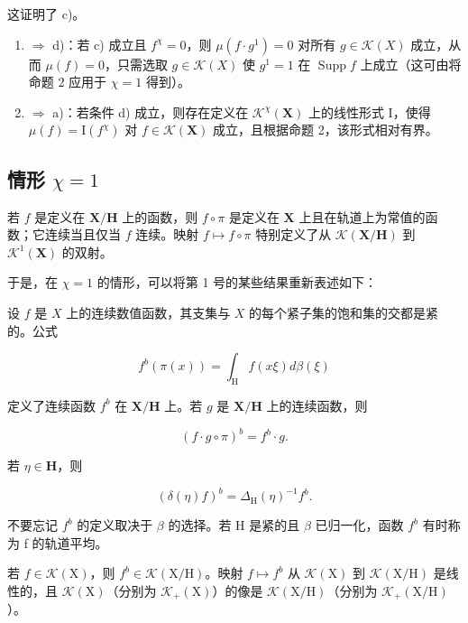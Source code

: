 这证明了 c)。

\begin{enumerate}
\def\labelenumi{\alph{enumi})}
\setcounter{enumi}{2}
\item
  \(\Rightarrow\) d)：若 c) 成立且 \(f^{\chi} = 0\)，则 \(\mu(f \cdot g^{1}) = 0\) 对所有 \(g \in \mathcal{K}(X)\) 成立，从而 \(\mu(f) = 0\)，只需选取 \(g \in \mathcal{K}(X)\) 使 \(g^{1} = 1\) 在 \(\operatorname{Supp} f\) 上成立（这可由将命题 2 应用于 \(\chi = 1\) 得到）。
\item
  \(\Rightarrow\) a)：若条件 d) 成立，则存在定义在 \(\mathcal{K}^{\chi}(\mathbf{X})\) 上的线性形式 I，使得 \(\mu(f) = \mathrm{I}(f^{\chi})\) 对 \(f \in \mathcal{K}(\mathbf{X})\) 成立，且根据命题 2，该形式相对有界。
\end{enumerate}

\subsection{\texorpdfstring{情形 \(\chi = 1\)}{情形 \textbackslash chi = 1}}

若 \(f\) 是定义在 \(\mathbf{X} / \mathbf{H}\) 上的函数，则 \(f \circ \pi\) 是定义在 \(\mathbf{X}\) 上且在轨道上为常值的函数；它连续当且仅当 \(f\) 连续。映射 \(f \mapsto f \circ \pi\) 特别定义了从 \(\mathcal{K}(\mathbf{X} / \mathbf{H})\) 到 \(\mathcal{K}^1(\mathbf{X})\) 的双射。

于是，在 \(\chi = 1\) 的情形，可以将第 1 号的某些结果重新表述如下：

设 \(f\) 是 \(X\) 上的连续数值函数，其支集与 \(X\) 的每个紧子集的饱和集的交都是紧的。公式

\[
f ^ {b} (\pi (x)) = \int_ {\mathrm{H}} f (x \xi) d \beta (\xi)\tag{3}
\]

定义了连续函数 \(f^{b}\) 在 \(\mathbf{X} / \mathbf{H}\) 上。若 \(g\) 是 \(\mathbf{X} / \mathbf{H}\) 上的连续函数，则

\[
(f \cdot g \circ \pi) ^ {b} = f ^ {b} \cdot g.\tag{4}
\]

若 \(\eta \in \mathbf{H}\)，则

\[
\left(\delta (\eta) f\right) ^ {b} = \Delta_ {\mathrm{H}} (\eta) ^ {- 1} f ^ {b}.\tag{5}
\]

不要忘记 \(f^{b}\) 的定义取决于 \(\beta\) 的选择。若 H 是紧的且 \(\beta\) 已归一化，函数 \(f^{b}\) 有时称为 f 的轨道平均。

若 \(f \in \mathcal{K}(\mathrm{X})\)，则 \(f^{b} \in \mathcal{K}(\mathrm{X / H})\)。映射 \(f \mapsto f^{b}\) 从 \(\mathcal{K}(\mathrm{X})\) 到 \(\mathcal{K}(\mathrm{X / H})\) 是线性的，且 \(\mathcal{K}(\mathrm{X})\)（分别为 \(\mathcal{K}_{+}(\mathrm{X})\)）的像是 \(\mathcal{K}(\mathrm{X / H})\)（分别为 \(\mathcal{K}_{+}(\mathrm{X / H})\)）。

